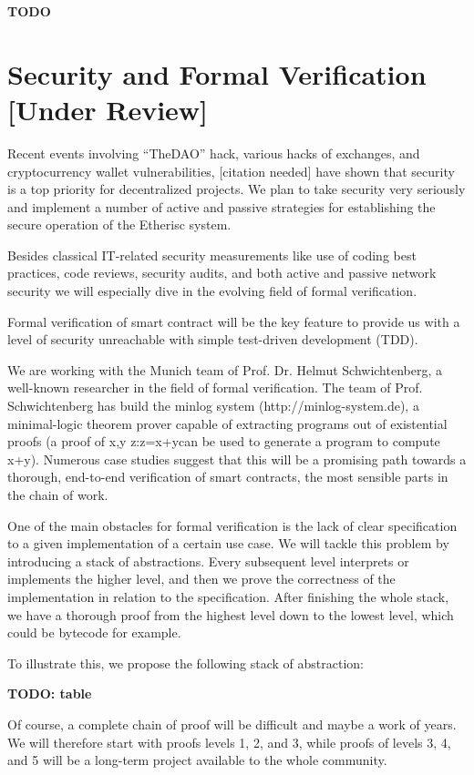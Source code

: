 \documentclass[12pt]{article}
\begin{document}
\textbf{TODO}

\section{Security and Formal Verification [Under Review]}

Recent events involving “TheDAO” hack, various hacks of exchanges, and cryptocurrency wallet vulnerabilities, [citation needed] have shown that security is a top priority for decentralized projects. We plan to take security very seriously and implement a number of active and passive strategies for establishing the secure operation of the Etherisc system.

Besides classical IT-related security measurements like use of coding best practices, code reviews, security audits, and both active and passive network security we will especially dive in the evolving field of formal verification.


Formal verification of smart contract will be the key feature to provide us with a level of security unreachable with simple test-driven development (TDD).

We are working with the Munich team of Prof. Dr. Helmut Schwichtenberg, a well-known researcher in the field of formal verification. The team of Prof. Schwichtenberg has build the minlog system (http://minlog-system.de), a minimal-logic theorem prover capable of extracting programs out of existential proofs (a proof of x,y z:z=x+ycan be used to generate a program to compute x+y). Numerous case studies suggest that this will be a promising path towards a thorough, end-to-end verification of smart contracts, the most sensible parts in the chain of work.


One of the main obstacles for formal verification is the lack of clear specification to a given implementation of a certain use case. We will tackle this problem by introducing a stack of abstractions. Every subsequent level interprets or implements the higher level, and then we prove the correctness of the implementation in relation to the specification. After finishing the whole stack, we have a thorough proof from the highest level down to the lowest level, which could be bytecode for example.

To illustrate this, we propose the following stack of abstraction:

\textbf{TODO: table}

Of course, a complete chain of proof will be difficult and maybe a work of years. We will therefore start with proofs levels 1, 2, and 3, while proofs of levels 3, 4, and 5 will be a long-term project available to the whole community.
\end{document}
